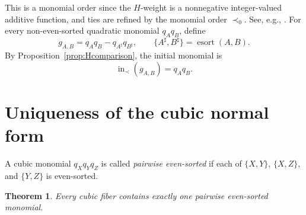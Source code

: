 \documentclass[11pt]{amsart}
\newtheorem{theorem}{Theorem}[section]
\theoremstyle{definition}
\newcommand{\inop}{\operatorname{in}}
\newcommand{\esort}{\operatorname{esort}}
\numberwithin{equation}{section}
\begin{document}
This is a monomial order since the $H$-weight is a nonnegative integer-valued additive function, and ties are refined by the monomial order $\prec_0$.
See, e.g., \cite[Chapters 1 and 3]{Sturmfels1996}.
For every non-even-sorted quadratic monomial $q_Aq_B$, define
\begin{equation}\label{eq:gAB}
g_{A,B}=q_Aq_B-q_{A^\sharp}q_{B^\sharp},
 \qquad
 \{A^\sharp,B^\sharp\}=\esort(A,B).
\end{equation}
By Proposition~\ref{prop:Hcomparison}, the initial monomial is 
\begin{equation}\label{eq:LM}
 \inop_\prec(g_{A,B})=q_Aq_B.
\end{equation}

\section{Uniqueness of the cubic normal form}\label{sec:cubic}

A cubic monomial $q_Xq_Yq_Z$ is called \emph{pairwise even-sorted} if each of $\{X,Y\}$, $\{X,Z\}$, and $\{Y,Z\}$ is even-sorted.


\begin{theorem} \label{thm:cubicunique}
Every cubic fiber contains exactly one pairwise even-sorted monomial.
\end{theorem}
\end{document}
